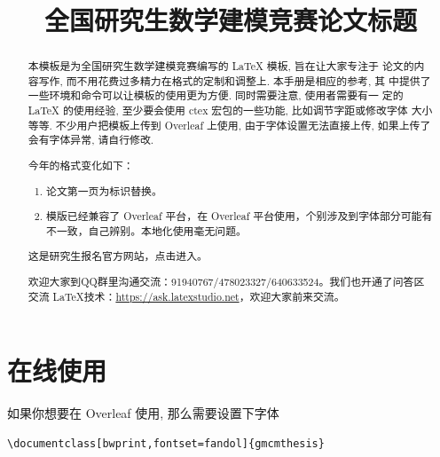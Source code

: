 \documentclass[bwprint]{gmcmthesis}
\title{全国研究生数学建模竞赛论文标题}
\begin{document}
 \maketitle

\begin{abstract}
本模板是为全国研究生数学建模竞赛编写的 \LaTeX{} 模板, 旨在让大家专注于
论文的内容写作, 而不用花费过多精力在格式的定制和调整上. 本手册是相应的参考, 其
中提供了一些环境和命令可以让模板的使用更为方便. 同时需要注意, 使用者需要有一
定的 \LaTeX{} 的使用经验, 至少要会使用 ctex 宏包的一些功能, 比如调节字距或修改字体
大小等等. 不少用户把模板上传到 Overleaf 上使用, 由于字体设置无法直接上传, 如果上传了会有字体异常, 请自行修改. 


 \begin{mdframed} [%
	roundcorner=5pt,
	linecolor=gray!50,
	outerlinewidth=0.5pt,
	middlelinewidth=0.3pt, backgroundcolor=gray!2,
innertopmargin=\topskip, frametitle={2025年格式变化说明},
frametitlefont= \bfseries,frametitlerule=true,frametitlealignment =\raggedright\noindent,
frametitlerulewidth=.5pt, frametitlebackgroundcolor=gray!2,]
今年的格式变化如下：
\begin{enumerate}
\item 论文第一页为标识替换。
\item 模版已经兼容了 Overleaf 平台，在 Overleaf 平台使用，个别涉及到字体部分可能有不一致，自己辨别。本地化使用毫无问题。
\end{enumerate}

\end{mdframed}

这是研究生报名官方网站，点击\href{https://cpipc.acge.org.cn/cw/hp/4}{}进入。

欢迎大家到QQ群里沟通交流：91940767/478023327/640633524。我们也开通了问答区交流 \LaTeX{}技术：\url{https://ask.latexstudio.net}，欢迎大家前来交流。


\end{abstract}

\pagestyle{plain}


\section{在线使用}

如果你想要在 Overleaf 使用, 那么需要设置下字体
\begin{lstlisting}[language={[latex]TeX}]
\documentclass[bwprint,fontset=fandol]{gmcmthesis}
\end{lstlisting}
\end{document}
